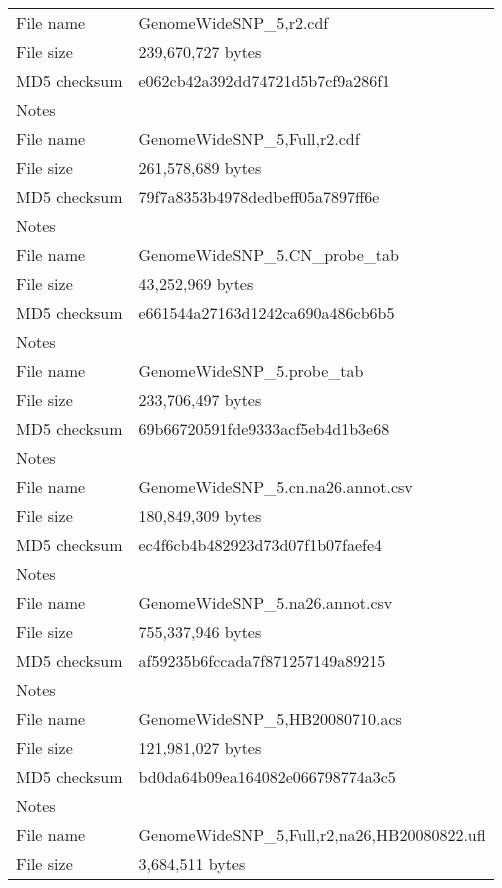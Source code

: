 \documentclass[10pt,a4paper]{article}
\begin{document}
\begin{table}[htp]
\begin{center}
\begin{tabular}{lp{}}
\hline
File name    & GenomeWideSNP\_5,r2.cdf \\
File size    & 239,670,727 bytes \\
MD5 checksum & e062cb42a392dd74721d5b7cf9a286f1 \\
Notes        &  \\
\hline
File name    & GenomeWideSNP\_5,Full,r2.cdf \\
File size    & 261,578,689 bytes \\
MD5 checksum & 79f7a8353b4978dedbeff05a7897ff6e \\
Notes        &  \\
\hline
File name    & GenomeWideSNP\_5.CN\_probe\_tab \\
File size    & 43,252,969 bytes \\
MD5 checksum & e661544a27163d1242ca690a486cb6b5 \\
Notes        &  \\
\hline
File name    & GenomeWideSNP\_5.probe\_tab \\
File size    & 233,706,497 bytes \\
MD5 checksum & 69b66720591fde9333acf5eb4d1b3e68 \\
Notes        &  \\
\hline
File name    & GenomeWideSNP\_5.cn.na26.annot.csv \\
File size    & 180,849,309 bytes \\
MD5 checksum & ec4f6cb4b482923d73d07f1b07faefe4 \\
Notes        &  \\
\hline
File name    & GenomeWideSNP\_5.na26.annot.csv \\
File size    & 755,337,946 bytes \\
MD5 checksum & af59235b6fccada7f871257149a89215 \\
Notes        &  \\
\hline
File name    & GenomeWideSNP\_5,HB20080710.acs \\
File size    & 121,981,027 bytes \\
MD5 checksum & bd0da64b09ea164082e066798774a3c5 \\
Notes        &  \\
\hline
File name    & GenomeWideSNP\_5,Full,r2,na26,HB20080822.ufl \\
File size    & 3,684,511 bytes \\

\end{tabular}
\end{center}
\end{table}
\end{document}
